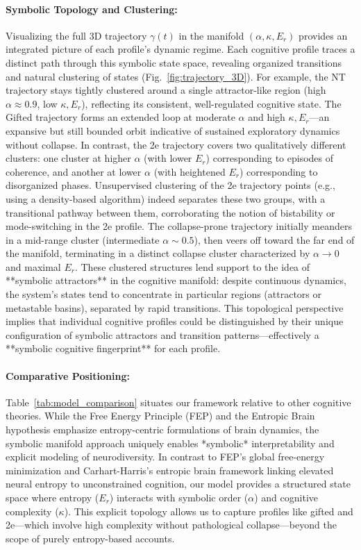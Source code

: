 \paragraph{Symbolic Topology and Clustering:} Visualizing the full 3D trajectory $\gamma(t)$ in the manifold $(\alpha, \kappa, E_r)$ provides an integrated picture of each profile’s dynamic regime. Each cognitive profile traces a distinct path through this symbolic state space, revealing organized transitions and natural clustering of states (Fig.~\ref{fig:trajectory_3D}). For example, the NT trajectory stays tightly clustered around a single attractor-like region (high $\alpha\approx0.9$, low $\kappa,\!E_r$), reflecting its consistent, well-regulated cognitive state. The Gifted trajectory forms an extended loop at moderate $\alpha$ and high $\kappa,E_r$—an expansive but still bounded orbit indicative of sustained exploratory dynamics without collapse. In contrast, the 2e trajectory covers two qualitatively different clusters: one cluster at higher $\alpha$ (with lower $E_r$) corresponding to episodes of coherence, and another at lower $\alpha$ (with heightened $E_r$) corresponding to disorganized phases. Unsupervised clustering of the 2e trajectory points (e.g., using a density-based algorithm) indeed separates these two groups, with a transitional pathway between them, corroborating the notion of bistability or mode-switching in the 2e profile. The collapse-prone trajectory initially meanders in a mid-range cluster (intermediate $\alpha\sim0.5$), then veers off toward the far end of the manifold, terminating in a distinct collapse cluster characterized by $\alpha \to 0$ and maximal $E_r$. These clustered structures lend support to the idea of **symbolic attractors** in the cognitive manifold: despite continuous dynamics, the system’s states tend to concentrate in particular regions (attractors or metastable basins), separated by rapid transitions. This topological perspective implies that individual cognitive profiles could be distinguished by their unique configuration of symbolic attractors and transition patterns—effectively a **symbolic cognitive fingerprint** for each profile.

\paragraph{Comparative Positioning:} Table~\ref{tab:model_comparison} situates our framework relative to other cognitive theories. While the Free Energy Principle (FEP) and the Entropic Brain hypothesis emphasize entropy-centric formulations of brain dynamics, the symbolic manifold approach uniquely enables *symbolic* interpretability and explicit modeling of neurodiversity. In contrast to FEP’s global free-energy minimization and Carhart-Harris’s entropic brain framework \cite{carhart2014entropic} linking elevated neural entropy to unconstrained cognition, our model provides a structured state space where entropy ($E_r$) interacts with symbolic order ($\alpha$) and cognitive complexity ($\kappa$). This explicit topology allows us to capture profiles like gifted and 2e—which involve high complexity without pathological collapse—beyond the scope of purely entropy-based accounts.


